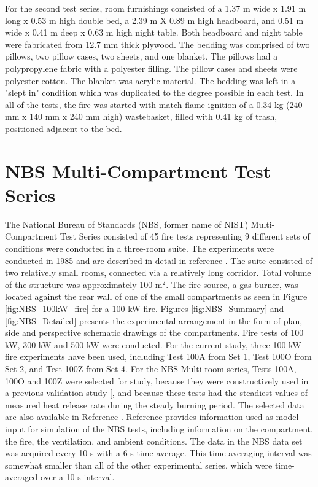 For the second test series, room furnishings consisted of a 1.37 m wide x 1.91 m long x 0.53 m high double bed, a 2.39 m X 0.89 m high headboard, and 0.51 m wide x 0.41 m deep x 0.63 m high night table. Both headboard and night table were fabricated from 12.7 mm thick plywood. The bedding was comprised of two pillows, two pillow cases, two sheets, and one blanket. The pillows had a polypropylene fabric with a polyester filling. The pillow cases and sheets were polyester-cotton. The blanket was acrylic material. The bedding was left in a "slept in" condition which was duplicated to the degree possible in each test. In all of the tests, the fire was started with match flame ignition of a 0.34 kg (240 mm x 140 mm x 240 mm high) wastebasket, filled with 0.41 kg of trash, positioned adjacent to the bed.

\section{NBS Multi-Compartment Test Series}

The National Bureau of Standards (NBS, former name of NIST) Multi-Compartment Test Series consisted of 45 fire tests representing 9 different sets of conditions were conducted in a three-room suite.  The experiments were conducted in 1985 and are described in detail in reference \cite{Peacock:1988}.  The suite consisted of two relatively small rooms, connected via a relatively long corridor. Total volume of the structure was approximately 100 m$^2$. The fire source, a gas burner, was located against the rear wall of one of the small compartments as seen in Figure \ref{fig:NBS_100kW_fire} for a 100 kW fire.  Figures \ref{fig:NBS_Summary} and \ref{fig:NBS_Detailed} presents the experimental arrangement in the form of plan, side and perspective schematic drawings of the compartments. Fire tests of 100 kW, 300 kW and 500 kW were conducted. For the current  study, three 100 kW fire experiments have been used, including Test 100A from Set 1, Test 100O from Set 2, and Test 100Z from Set 4. For the NBS Multi-room series, Tests 100A, 100O and 100Z were selected for study, because they were constructively used in a previous validation study [\cite{EPRI}, and because these tests had  the steadiest values of measured heat release rate during the steady burning period. The selected data are also available in Reference \cite{EPRI}.   Reference \cite{NRCNUREG1824Experimental} provides information used as model input for simulation of the NBS tests, including information on the compartment, the fire, the ventilation, and ambient conditions. The data in the NBS data set was acquired every 10 s with a 6 s time-average.  This time-averaging interval was somewhat smaller than all of the other experimental series, which were time-averaged over a 10 s interval. 

